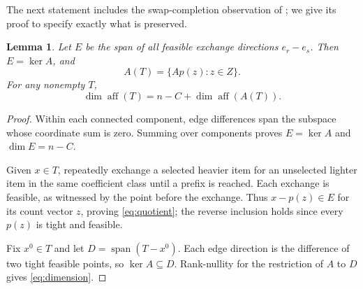 \documentclass[11pt]{article}
\newtheorem{lemma}[theorem]{Lemma}
\newcommand{\aff}{\operatorname{aff}}\newcommand{\spn}{\operatorname{span}}
\begin{document}
The next statement includes the swap-completion observation of \cite[Lemma 3.1]{progress}; we give its proof to specify exactly what is preserved.
\begin{lemma}\label{lem:quotient}
Let $E$ be the span of all feasible exchange directions $e_r-e_s$. Then $E=\ker A$, and
\begin{equation}\label{eq:quotient}
 A(T)=\{Ap(z):z\in Z\}.
\end{equation}
For any nonempty $T$,
\begin{equation}\label{eq:dimension}
 \dim\aff(T)=n-C+\dim\aff(A(T)).
\end{equation}
\end{lemma}
\begin{proof}
Within each connected component, edge differences span the subspace whose coordinate sum is zero. Summing over components proves $E=\ker A$ and $\dim E=n-C$.

Given $x\in T$, repeatedly exchange a selected heavier item for an unselected lighter item in the same coefficient class until a prefix is reached. Each exchange is feasible, as witnessed by the point before the exchange. Thus $x-p(z)\in E$ for its count vector $z$, proving \eqref{eq:quotient}; the reverse inclusion holds since every $p(z)$ is tight and feasible.

Fix $x^0\in T$ and let $D=\spn(T-x^0)$. Each edge direction is the difference of two tight feasible points, so $\ker A\subseteq D$. Rank-nullity for the restriction of $A$ to $D$ gives \eqref{eq:dimension}.
\end{proof}
\end{document}
